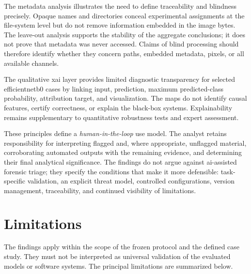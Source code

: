 The metadata analysis illustrates the need to define traceability and blindness
precisely. Opaque names and directories conceal experimental assignments at the
file-system level but do not remove information embedded in the image bytes.
The leave-out analysis supports the stability of the aggregate conclusions;
it does not prove that metadata was never accessed. Claims of blind processing
should therefore identify whether they concern paths, embedded metadata,
pixels, or all available channels.

The qualitative \gls{xai} layer provides limited diagnostic transparency for
selected \gls{efficientnetb0} cases by linking input, prediction, maximum
predicted-class probability, attribution target, and visualization. The maps do
not identify causal features, certify correctness, or explain the black-box
systems. Explainability remains supplementary to quantitative robustness tests
and expert assessment.

These principles define a \textit{human-in-the-loop} use model. The analyst
retains responsibility for interpreting flagged and, where appropriate,
unflagged material, corroborating automated outputs with the remaining
evidence, and determining their final analytical significance. The findings do
not argue against \gls{ai}-assisted forensic triage; they specify the conditions
that make it more defensible: task-specific validation, an explicit threat
model, controlled configurations, version management, traceability, and
continued visibility of limitations.


\section{Limitations}
\label{sec:conclusions-limitations}

The findings apply within the scope of the frozen protocol and the defined case
study. They must not be interpreted as universal validation of the evaluated
models or software systems. The principal limitations are summarized below.

